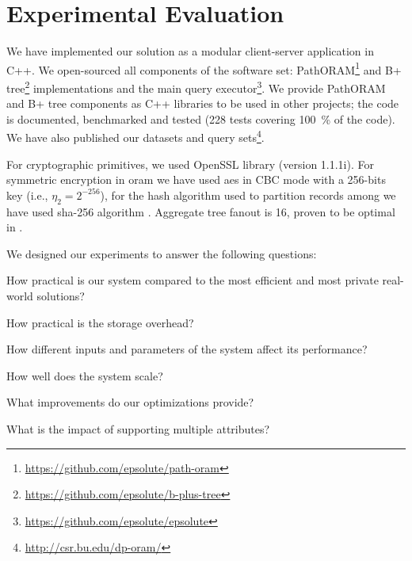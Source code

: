 \section{Experimental Evaluation}\label{section:range-persistent:experiments}

	We have implemented our solution as a modular client-server application in C++.
	We open-sourced all components of the software set: PathORAM\footnote{\url{https://github.com/epsolute/path-oram}} and B+ tree\footnote{\url{https://github.com/epsolute/b-plus-tree}} implementations and the main query executor\footnote{\url{https://github.com/epsolute/epsolute}}.
	We provide PathORAM and B+ tree components as C++ libraries to be used in other projects; the code is documented, benchmarked and tested (228 tests covering \SI{100}{\percent} of the code).
	We have also published our datasets and query sets\footnote{\url{http://csr.bu.edu/dp-oram/}}.

	For cryptographic primitives, we used OpenSSL library (version 1.1.1i).
	For symmetric encryption in \acrshort{oram} we have used \acrshort{aes} in CBC mode \cite{nist-aes,nist-modes} with a 256-bits key (i.e., $\eta_2 = 2^{-256}$), for the hash algorithm  used to partition records among  we have used \acrshort{sha}-256 algorithm \cite{nist-hash}.
	Aggregate tree fanout \fanout{} is 16, proven to be optimal in \cite{hierarchical-methods-for-dp}.

	We designed our experiments to answer the following questions:
	\newlength{\questionLength}
	\settowidth{\questionLength}{Question-5}
	\begin{description}[
		font=\bfseries,
		leftmargin=\dimexpr\questionLength+1.0em\relax,
		labelindent=0pt,
		labelwidth=\questionLength%
	]
		\item[Question-1\label{item:question-practicality}] How practical is our system compared to the most efficient and most private real-world solutions?
		\item[Question-2\label{item:question-storage}] How practical is the storage overhead?
		\item[Question-3\label{item:question-parameters}] How different inputs and parameters of the system affect its performance?
		\item[Question-4\label{item:question-scalability}] How well does the system scale?
		\item[Question-5\label{item:question-optimizations}] What improvements do our optimizations provide?
		\item[Question-6\label{item:question-attributes}] What is the impact of supporting multiple attributes?
	\end{description}

